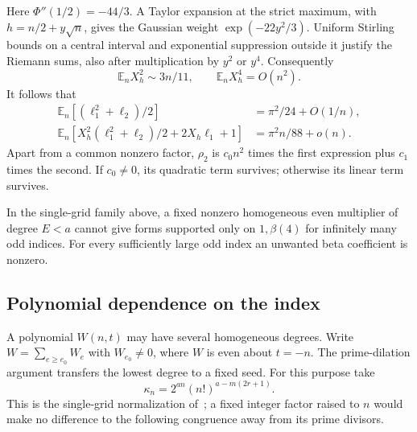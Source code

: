 Here $\Phi''(1/2)=-44/3$. A Taylor expansion at the strict maximum,
with $h=n/2+y\sqrt n$, gives the Gaussian weight
$\exp(-22y^2/3)$. Uniform Stirling bounds on a central interval and
exponential suppression outside it justify the Riemann sums, also
after multiplication by $y^2$ or $y^4$. Consequently
\[
 \mathbb E_nX_h^2\sim3n/11,\qquad \mathbb E_nX_h^4=O(n^2).
\]
It follows that
\begin{align*}
 \mathbb E_n[(\ell_1^2+\ell_2)/2]&=\pi^2/24+O(1/n),\\
 \mathbb E_n[X_h^2(\ell_1^2+\ell_2)/2+2X_h\ell_1+1]
                                      &=\pi^2 n/88+o(n).
\end{align*}
Apart from a common nonzero factor, $\rho_2$ is $c_0n^2$ times the
first expression plus $c_1$ times the second. If $c_0\ne0$, its
quadratic term survives; otherwise its linear term survives.

\begin{theorem}\label{thm:fixed-isolation}
In the single-grid family above, a fixed nonzero homogeneous even
multiplier of degree $E<a$ cannot give forms supported only on
$1,\beta(4)$ for infinitely many odd indices. For every sufficiently
large odd index an unwanted beta coefficient is nonzero.
\end{theorem}

\subsection{Polynomial dependence on the index}
A polynomial $W(n,t)$ may have several homogeneous degrees. Write
$W=\sum_{e\ge e_0}W_e$ with $W_{e_0}\ne0$, where $W$ is even about
$t=-n$. The prime-dilation argument transfers the lowest degree to a
fixed seed. For this purpose take
\[
 \kappa_n=2^{an}(n!)^{a-m(2r+1)}.
\]
This is the single-grid normalization of~\cite{shifted}; a fixed
integer factor raised to $n$ would make no difference to the following
congruence away from its prime divisors.

